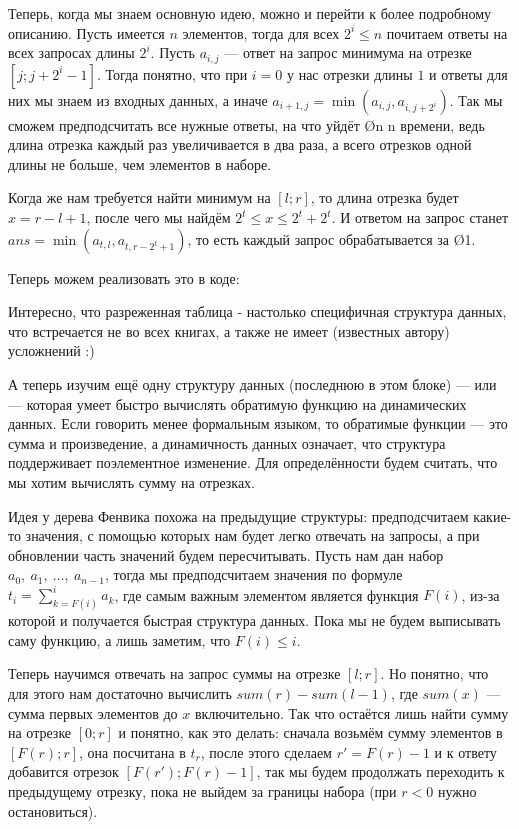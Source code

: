 {Теперь, когда мы знаем основную идею, можно и перейти к более подробному описанию. Пусть имеется $n$ элементов, тогда для всех $2^i \leq n$ почитаем ответы на всех запросах длины $2^i$. Пусть $a_{i, j}$ — ответ на запрос минимума на отрезке $[j; j + 2^i - 1]$. Тогда понятно, что при $i = 0$ у нас отрезки длины $1$ и ответы для них мы знаем из входных данных, а иначе $a_{i + 1, j} = \min( a_{i, j}, a_{i, j + 2^i} )$. Так мы сможем предподсчитать все нужные ответы, на что уйдёт \O{n \log n} времени, ведь длина отрезка каждый раз увеличивается в два раза, а всего отрезков одной длины не больше, чем элементов в наборе.

Когда же нам требуется найти минимум на $[l; r]$, то длина отрезка будет $x = r - l + 1$, после чего мы найдём $2^t \leq x \leq 2^t + 2^t$. И ответом на запрос станет $ans = \min( a_{t, l} ,  a_{t, r - 2^t + 1} )$, то есть каждый запрос обрабатывается за \O{1}.

Теперь можем реализовать это в коде:

\nocode

Интересно, что разреженная таблица - настолько специфичная структура данных, что встречается не во всех книгах, а также не имеет (известных автору) усложнений :)


А теперь изучим ещё одну структуру данных (последнюю в этом блоке) —  или  — которая умеет быстро вычислять обратимую функцию на динамических данных. Если говорить менее формальным языком, то обратимые функции — это сумма и произведение, а динамичность данных означает, что структура поддерживает поэлементное изменение. Для определённости будем считать, что мы хотим вычислять сумму на отрезках.

Идея у дерева Фенвика похожа на предыдущие структуры: предподсчитаем какие-то значения, с помощью которых нам будет легко отвечать на запросы, а при обновлении часть значений будем пересчитывать. Пусть нам дан набор $a_0,\ a_1,\ \ldots,\ a_{n - 1}$, тогда мы предподсчитаем значения по формуле $t_i = \sum\limits_{k=F(i)}^{i} a_k$, где самым важным элементом является функция $F(i)$, из-за которой и получается быстрая структура данных. Пока мы не будем выписывать саму функцию, а лишь заметим, что $F(i) \leq i$.

Теперь научимся отвечать на запрос суммы на отрезке $[l;r]$. Но понятно, что для этого нам достаточно вычислить $sum(r) - sum(l - 1)$, где $sum(x)$ — сумма первых элементов до $x$ включительно. Так что остаётся лишь найти сумму на отрезке $[0; r]$ и понятно, как это делать: сначала возьмём сумму элементов в $[F(r); r]$, она посчитана в $t_r$, после этого сделаем $r' = F(r) - 1$ и к ответу добавится отрезок $[F(r'); F(r) - 1]$, так мы будем продолжать переходить к предыдущему отрезку, пока не выйдем за границы набора (при $r < 0$ нужно остановиться).

}
